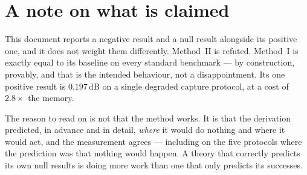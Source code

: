 \section*{A note on what is claimed}

This document reports a negative result and a null result alongside its positive
one, and it does not weight them differently. Method~II is refuted. Method~I is
exactly equal to its baseline on every standard benchmark --- by construction,
provably, and that is the intended behaviour, not a disappointment. Its
one positive result is $0.197$\,dB on a single degraded capture protocol, at a
cost of $2.8\times$ the memory.

The reason to read on is not that the method works. It is that the derivation
predicted, in advance and in detail, \emph{where} it would do nothing and where
it would act, and the measurement agrees --- including on the five protocols
where the prediction was that nothing would happen. A theory that correctly
predicts its own null results is doing more work than one that only predicts its
successes.
